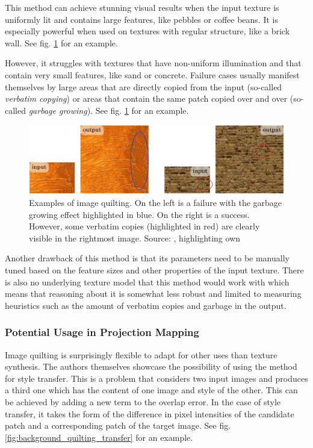 This method can achieve stunning visual results when the input texture is uniformly lit and contains large features, like pebbles or coffee beans. It is especially powerful when used on textures with regular structure, like a brick wall. See fig. \ref{fig:background_quilting_pros_cons} for an example.

However, it struggles with textures that have non-uniform illumination and that contain very small features, like sand or concrete. Failure cases usually manifest themselves by large areas that are directly copied from the input (so-called \textit{verbatim copying}) or areas that contain the same patch copied over and over (so-called \textit{garbage growing}). See fig. \ref{fig:background_quilting_pros_cons} for an example.

\begin{figure}[ht]
    \centering
    \includegraphics[width=\textwidth]{images/02-quilting_pros_cons_compressed.jpg}
    \caption{Examples of image quilting. On the left is a failure with the garbage growing effect highlighted in blue. On the right is a success. However, some verbatim copies (highlighted in red) are clearly visible in the rightmost image. Source: \citet{Raad2018}, highlighting own}
    \label{fig:background_quilting_pros_cons}
\end{figure}

Another drawback of this method is that its parameters need to be manually tuned based on the feature sizes and other properties of the input texture. There is also no underlying texture model that this method would work with which means that reasoning about it is somewhat less robust and limited to measuring heuristics such as the amount of verbatim copies and garbage in the output.

\subsubsection{Potential Usage in Projection Mapping}
\label{section:background-texture_synthesis-patch_based-projection_mapping}

Image quilting is surprisingly flexible to adapt for other uses than texture synthesis. The authors themselves showcase the possibility of using the method for style transfer. This is a problem that considers two input images and produces a third one which has the content of one image and style of the other. This can be achieved by adding a new term to the overlap error. In the case of style transfer, it takes the form of the difference in pixel intensities of the candidate patch and a corresponding patch of the target image. See fig. \ref{fig:background_quilting_transfer} for an example.

